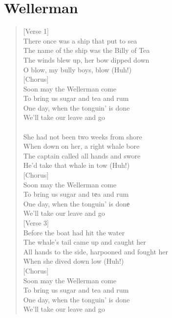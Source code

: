 \documentclass[11pt]{article}
\begin{document}
\section{Wellerman}
\label{sec:org80ff315}
\begin{verse}
[Verse 1]\\
There once was a ship that put to sea\\
The name of the ship was the Billy of Tea\\
The winds blew up, her bow dipped down\\
O blow, my bully boys, blow (Huh!)\\
\vspace*{1em}
[Chorus]\\
Soon may the Wellerman come\\
To bring us sugar and tea and rum\\
One day, when the tonguin' is done\\
We'll take our leave and go\\
[Verse 2]\\
She had not been two weeks from shore\\
When down on her, a right whale bore\\
The captain called all hands and swore\\
He'd take that whale in tow (Huh!)\\
\vspace*{1em}
[Chorus]\\
Soon may the Wellerman come\\
To bring us sugar and tеa and rum\\
One day, when the tonguin' is donе\\
We'll take our leave and go\\
\vspace*{1em}
[Verse 3]\\
Before the boat had hit the water\\
The whale's tail came up and caught her\\
All hands to the side, harpooned and fought her\\
When she dived down low (Huh!)\\
\vspace*{1em}
[Chorus]\\
Soon may the Wellerman come\\
To bring us sugar and tea and rum\\
One day, when the tonguin' is done\\
We'll take our leave and go\\

\end{verse}
\end{document}
